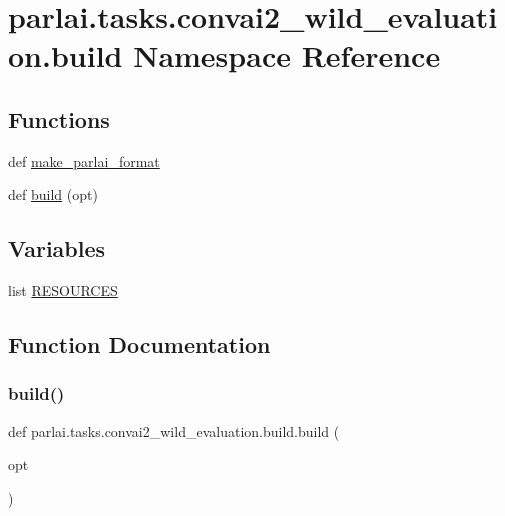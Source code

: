 \hypertarget{namespaceparlai_1_1tasks_1_1convai2__wild__evaluation_1_1build}{}\section{parlai.\+tasks.\+convai2\+\_\+wild\+\_\+evaluation.\+build Namespace Reference}
\label{namespaceparlai_1_1tasks_1_1convai2__wild__evaluation_1_1build}
\subsection*{Functions}
\begin{DoxyCompactItemize}
\item 
def \hyperlink{namespaceparlai_1_1tasks_1_1convai2__wild__evaluation_1_1build_a6c2b84806e2cb18c6eedb72d161dec5e}{make\+\_\+parlai\+\_\+format}
\item 
def \hyperlink{namespaceparlai_1_1tasks_1_1convai2__wild__evaluation_1_1build_a7f46320f8766498ee5f87f68e24da31b}{build} (opt)
\end{DoxyCompactItemize}
\subsection*{Variables}
\begin{DoxyCompactItemize}
\item 
list \hyperlink{namespaceparlai_1_1tasks_1_1convai2__wild__evaluation_1_1build_abdb1e0f90d76cfd525e4ef8f8e610839}{R\+E\+S\+O\+U\+R\+C\+ES}
\end{DoxyCompactItemize}


\subsection{Function Documentation}
\mbox{\label{namespaceparlai_1_1tasks_1_1convai2__wild__evaluation_1_1build_a7f46320f8766498ee5f87f68e24da31b}} 
\subsubsection{\texorpdfstring{build()}{build()}}
{\footnotesize\ttfamily def parlai.\+tasks.\+convai2\+\_\+wild\+\_\+evaluation.\+build.\+build (\begin{DoxyParamCaption}\item[{}]{opt }\end{DoxyParamCaption})}

